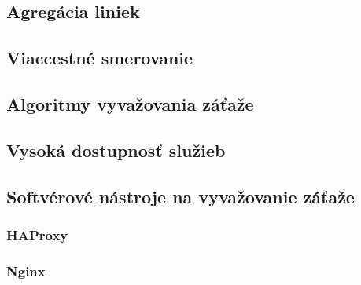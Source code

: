 \documentclass[12pt, a4paper]{article}
\begin{document}
\subsection{Agregácia liniek}

\subsection{Viaccestné smerovanie}

\subsection{Algoritmy vyvažovania záťaže}

\subsection{Vysoká dostupnosť služieb}

\subsection{Softvérové nástroje na vyvažovanie záťaže}

\subsubsection{HAProxy}

\subsubsection{Nginx}



\end{document}
